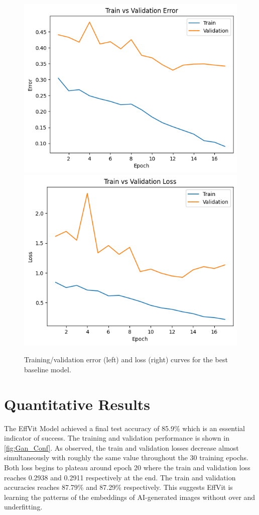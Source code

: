 \documentclass{article} %
\begin{document}
\begin{figure}[h]
    \begin{center}
        \includegraphics[scale=0.45]{figs/baseline_error_curves.png}
        \includegraphics[scale=0.45]{figs/baseline_loss_curves.png}
    \end{center}
    \caption{Training/validation error (left) and loss (right) curves for the best baseline model.}
    \label{fig:baseline_curves}
\end{figure}

\section{Quantitative Results}
The EffVit Model achieved a final test accuracy of 85.9\% which is an essential indicator of success. The training and validation performance is shown in \ref{fig:Gan_Conf}. As observed, the train and validation losses decrease almost simultaneously with roughly the same value throughout the 30 training epochs. Both loss begins to plateau around epoch 20 where the train and validation loss reaches 0.2938 and 0.2911 respectively at the end. The train and validation accuracies reaches 87.79\% and 87.29\% respectively. This suggests EffVit is learning the patterns of the embeddings of AI-generated images without over and underfitting. 
\end{document}
